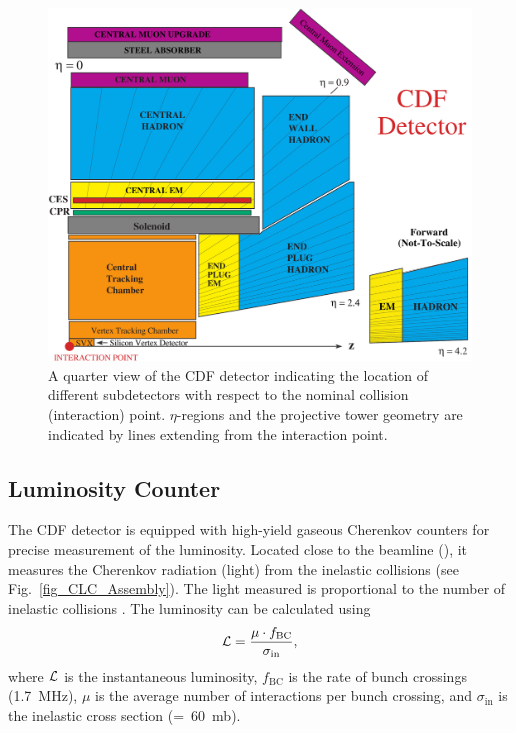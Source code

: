 \begin{figure}[htb!]
 \centering
 \includegraphics[scale=0.24]{./CDF_ColorQuarter_TowerGeometry.png}
 \caption{A quarter view of the CDF detector indicating the location of different subdetectors with respect to the nominal collision (interaction) point. $\eta$-regions and the projective tower geometry are indicated by lines extending from the interaction point.}
 \label{fig:EtaRegionsTowerGeometry}
\end{figure}


\subsection{Luminosity Counter}
The CDF detector is equipped with high-yield gaseous Cherenkov counters for precise measurement of the luminosity. Located close to the beamline (), it measures the Cherenkov radiation (light) from the inelastic collisions (see Fig.~\ref{fig_CLC_Assembly}). The light measured is proportional to the number of inelastic collisions \cite{pap:CLCperformance}. The luminosity can be calculated using
\begin{equation}
{\cal L} = \frac{\mu \cdot f_\mathrm{BC}}{\sigma_{\mathrm{in}}},
\label{eqa:LumDef2}
\end{equation}
where $\cal L$ is the instantaneous luminosity, $f_\mathrm{BC}$ is the rate of bunch crossings (1.7~MHz), $\mu$ is the average number of \ppbar interactions per bunch crossing, and $\sigma_\mathrm{in}$ is the inelastic cross section (=~60~mb).


